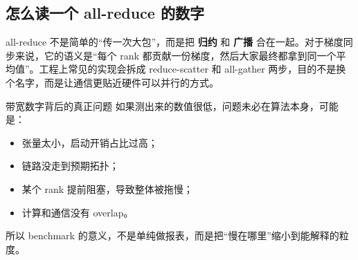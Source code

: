\subsection{怎么读一个 all-reduce 的数字}

all-reduce 不是简单的“传一次大包”，而是把 \textbf{归约} 和 \textbf{广播} 合在一起。对于梯度同步来说，它的语义是“每个 rank 都贡献一份梯度，然后大家最终都拿到同一个平均值”。工程上常见的实现会拆成 reduce-scatter 和 all-gather 两步，目的不是换个名字，而是让通信更贴近硬件可以并行的方式。

\begin{importantbox}{带宽数字背后的真正问题}
如果测出来的数值很低，问题未必在算法本身，可能是：
\begin{itemize}
    \item 张量太小，启动开销占比过高；
    \item 链路没走到预期拓扑；
    \item 某个 rank 提前阻塞，导致整体被拖慢；
    \item 计算和通信没有 overlap。
\end{itemize}
所以 benchmark 的意义，不是单纯做报表，而是把“慢在哪里”缩小到能解释的粒度。
\end{importantbox}

